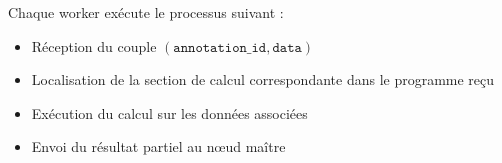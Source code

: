 \documentclass[12pt,a4paper]{report}
\theoremstyle{definition}
\begin{document}
Chaque worker exécute le processus suivant :

\begin{itemize}
    \item [$\bullet$]Réception du couple \((\texttt{annotation\_id}, \texttt{data})\)
    
    \item [$\bullet$]Localisation de la section de calcul correspondante dans le programme reçu
    
    \item [$\bullet$]Exécution du calcul sur les données associées
    
    \item [$\bullet$]Envoi du résultat partiel au nœud maître
\end{itemize}

\end{document}
